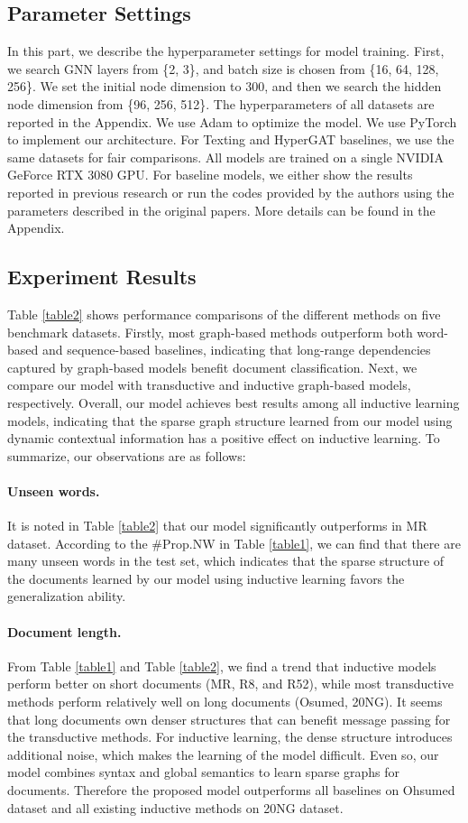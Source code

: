 \documentclass[letterpaper]{article} %
\begin{document}
\subsection{Parameter Settings}
In this part, we describe the hyperparameter settings for model training. First, we search GNN layers from \{2, 3\}, and batch size is chosen from \{16, 64, 128, 256\}. We set the initial node dimension to 300, and then we search the hidden node dimension from \{96, 256, 512\}. The hyperparameters of all datasets are reported in the Appendix. We use Adam \cite{kingma2015adam} to optimize the model. We use PyTorch \cite{paszke2019pytorch} to implement our architecture. For Texting and HyperGAT baselines, we use the same datasets for fair comparisons. All models are trained on a single NVIDIA GeForce RTX 3080 GPU. For baseline models, we either show the results reported in previous research \cite{yao2019graph} or run the codes provided by the authors using the parameters described in the original papers. More details can be found in the Appendix.
\subsection{Experiment Results}
Table \ref{table2} shows performance comparisons of the different methods on five benchmark datasets. Firstly, most graph-based methods outperform both word-based and sequence-based baselines, indicating that long-range dependencies captured by graph-based models benefit document classification.
Next, we compare our model with transductive and inductive graph-based models, respectively. Overall, our model achieves best results among all inductive learning models, indicating that the sparse graph structure learned from our model using dynamic contextual information has a positive effect on inductive learning.
To summarize, our observations are as follows:
\paragraph{Unseen words.}It is noted in Table \ref{table2} that our model significantly outperforms  in MR dataset. According to the \#Prop.NW in Table \ref{table1}, we can find that there are many unseen words in the test set, which indicates that the sparse structure of the documents learned by our model using inductive learning favors the generalization ability.
\paragraph{Document length.}From Table \ref{table1} and Table \ref{table2}, we find a trend that inductive models perform better on short documents (MR, R8, and R52), while most transductive methods perform relatively well on long documents (Osumed, 20NG).
It seems that long documents own denser structures that can benefit message passing for the transductive methods. For inductive learning, the dense structure introduces additional noise, which makes the learning of the model difficult.
Even so, our model combines syntax and global semantics to learn sparse graphs for documents. Therefore the proposed model outperforms all baselines on Ohsumed dataset and all existing inductive methods on 20NG dataset.
\end{document}
